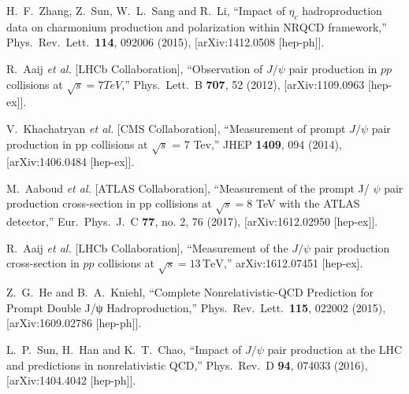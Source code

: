 \documentclass[aps,prc,preprint,superscriptaddress,showpacs,showkeys,amsmath]{revtex4-1}
\begin{document}
\begin{thebibliography}{100}
  H.~F.~Zhang, Z.~Sun, W.~L.~Sang and R.~Li,
  ``Impact of $\eta_c$ hadroproduction data on charmonium production and polarization within NRQCD framework,''
  Phys.\ Rev.\ Lett.\  {\bf 114}, 092006 (2015), [arXiv:1412.0508 [hep-ph]].





  R.~Aaij {\it et al.} [LHCb Collaboration],
  ``Observation of $J/\psi$ pair production in $pp$ collisions at $\sqrt{s}=7 TeV$,''
  Phys.\ Lett.\ B {\bf 707}, 52 (2012), [arXiv:1109.0963 [hep-ex]].


  V.~Khachatryan {\it et al.} [CMS Collaboration],
  ``Measurement of prompt $J/\psi$ pair production in pp collisions at $ \sqrt{s} $ = 7 Tev,''
  JHEP {\bf 1409}, 094 (2014), [arXiv:1406.0484 [hep-ex]].
 

  M.~Aaboud {\it et al.} [ATLAS Collaboration],
  ``Measurement of the prompt J/ $\psi $ pair production cross-section in pp collisions at $\sqrt{s} = 8$  TeV with the ATLAS detector,''
  Eur.\ Phys.\ J.\ C {\bf 77}, no. 2, 76 (2017), [arXiv:1612.02950 [hep-ex]].


  R.~Aaij {\it et al.} [LHCb Collaboration],
  ``Measurement of the $J/\psi$ pair production cross-section in $pp$ collisions at $\sqrt{s} = 13 \,{\mathrm{TeV}}$,''
  arXiv:1612.07451 [hep-ex].
  

  Z.~G.~He and B.~A.~Kniehl,
  ``Complete Nonrelativistic-QCD Prediction for Prompt Double J/ψ Hadroproduction,''
  Phys.\ Rev.\ Lett.\  {\bf 115}, 022002 (2015), [arXiv:1609.02786 [hep-ph]].


  L.~P.~Sun, H.~Han and K.~T.~Chao,
  ``Impact of $J/\psi$ pair production at the LHC and predictions in nonrelativistic QCD,''
  Phys.\ Rev.\ D {\bf 94}, 074033 (2016), [arXiv:1404.4042 [hep-ph]].





\end{thebibliography}
\end{document}
